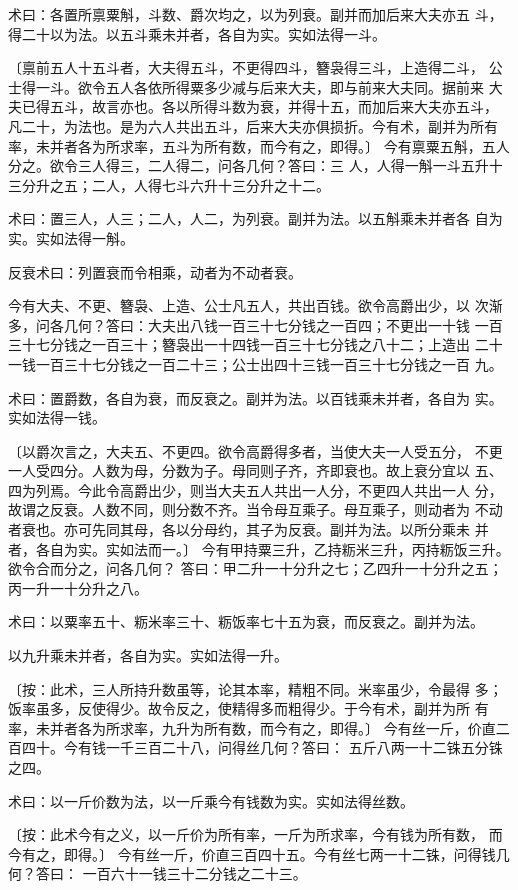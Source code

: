 \documentclass[a4paper,12pt,UTF8,twoside]{ctexbook}
\begin{document}
术曰：各置所禀粟斛，斗数、爵次均之，以为列衰。副并而加后来大夫亦五 斗，得二十以为法。以五斗乘未并者，各自为实。实如法得一斗。

〔禀前五人十五斗者，大夫得五斗，不更得四斗，簪袅得三斗，上造得二斗， 公士得一斗。欲令五人各依所得粟多少减与后来大夫，即与前来大夫同。据前来 大夫已得五斗，故言亦也。各以所得斗数为衰，并得十五，而加后来大夫亦五斗， 凡二十，为法也。是为六人共出五斗，后来大夫亦俱损折。今有术，副并为所有 率，未并者各为所求率，五斗为所有数，而今有之，即得。〕 今有禀粟五斛，五人分之。欲令三人得三，二人得二，问各几何？答曰：三 人，人得一斛一斗五升十三分升之五；二人，人得七斗六升十三分升之十二。

术曰：置三人，人三；二人，人二，为列衰。副并为法。以五斛乘未并者各 自为实。实如法得一斛。

反衰术曰：列置衰而令相乘，动者为不动者衰。

今有大夫、不更、簪袅、上造、公士凡五人，共出百钱。欲令高爵出少，以 次渐多，问各几何？答曰：大夫出八钱一百三十七分钱之一百四；不更出一十钱 一百三十七分钱之一百三十；簪袅出一十四钱一百三十七分钱之八十二；上造出 二十一钱一百三十七分钱之一百二十三；公士出四十三钱一百三十七分钱之一百 九。

术曰：置爵数，各自为衰，而反衰之。副并为法。以百钱乘未并者，各自为 实。实如法得一钱。

〔以爵次言之，大夫五、不更四。欲令高爵得多者，当使大夫一人受五分， 不更一人受四分。人数为母，分数为子。母同则子齐，齐即衰也。故上衰分宜以 五、四为列焉。今此令高爵出少，则当大夫五人共出一人分，不更四人共出一人 分，故谓之反衰。人数不同，则分数不齐。当令母互乘子。母互乘子，则动者为 不动者衰也。亦可先同其母，各以分母约，其子为反衰。副并为法。以所分乘未 并者，各自为实。实如法而一。〕 今有甲持粟三升，乙持粝米三升，丙持粝饭三升。欲令合而分之，问各几何？ 答曰：甲二升一十分升之七；乙四升一十分升之五；丙一升一十分升之八。

术曰：以粟率五十、粝米率三十、粝饭率七十五为衰，而反衰之。副并为法。

以九升乘未并者，各自为实。实如法得一升。

〔按：此术，三人所持升数虽等，论其本率，精粗不同。米率虽少，令最得 多；饭率虽多，反使得少。故令反之，使精得多而粗得少。于今有术，副并为所 有率，未并者各为所求率，九升为所有数，而今有之，即得。〕 今有丝一斤，价直二百四十。今有钱一千三百二十八，问得丝几何？答曰： 五斤八两一十二铢五分铢之四。

术曰：以一斤价数为法，以一斤乘今有钱数为实。实如法得丝数。

〔按：此术今有之义，以一斤价为所有率，一斤为所求率，今有钱为所有数， 而今有之，即得。〕 今有丝一斤，价直三百四十五。今有丝七两一十二铢，问得钱几何？答曰： 一百六十一钱三十二分钱之二十三。
\end{document}
